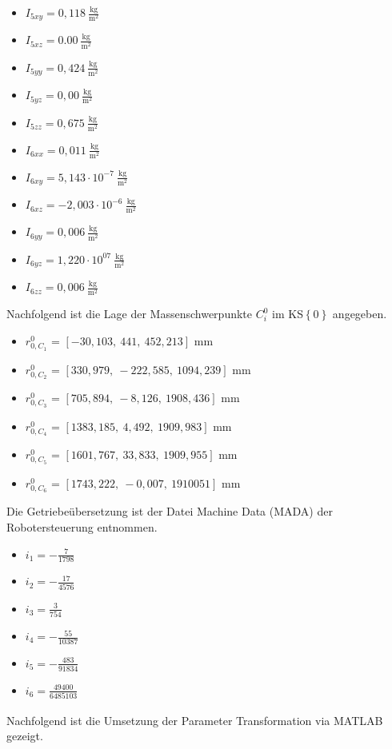 \begin{itemize}
	\item $I_{5xy} = 0,118~\frac{\text{kg}}{\text{m}^2}$
	\item $I_{5xz} = 0.00~\frac{\text{kg}}{\text{m}^2}$
	\item $I_{5yy} = 0,424~\frac{\text{kg}}{\text{m}^2}$
	\item $I_{5yz} = 0,00~\frac{\text{kg}}{\text{m}^2}$
	\item $I_{5zz} = 0,675~\frac{\text{kg}}{\text{m}^2}$
	\\
	\item $I_{6xx} = 0,011~\frac{\text{kg}}{\text{m}^2}$
	\item $I_{6xy} = 5,143\cdot10^{-7}~\frac{\text{kg}}{\text{m}^2}$
	\item $I_{6xz} = -2,003\cdot10^{-6}~\frac{\text{kg}}{\text{m}^2}$
	\item $I_{6yy} = 0,006~\frac{\text{kg}}{\text{m}^2}$
	\item $I_{6yz} = 1,220\cdot10^{07}~\frac{\text{kg}}{\text{m}^2}$
	\item $I_{6zz} = 0,006~\frac{\text{kg}}{\text{m}^2}$
\end{itemize}
%
Nachfolgend ist die Lage der Massenschwerpunkte $C_i^0$ im KS$\left\{0\right\}$ angegeben. 
% 
\begin{itemize}
	\item $r_{0,C_1}^0$ = $\left[-30,103,~441,~452,213\right]$ mm
	\item $r_{0,C_2}^0$ = $\left[330,979,~-222,585,~1094,239\right]$ mm
	\item $r_{0,C_3}^0$ = $\left[705,894,~-8,126,~1908,436\right]$ mm
	\item $r_{0,C_4}^0$ = $\left[1383,185,~4,492,~1909,983\right]$ mm
	\item $r_{0,C_5}^0$ = $\left[1601,767,~33,833,~1909,955\right]$ mm
	\item $r_{0,C_6}^0$ = $\left[1743,222,~-0,007,~1910 051\right]$ mm
\end{itemize}
%
Die Getriebeübersetzung ist der Datei Machine Data (MADA) der Robotersteuerung entnommen.
%
\begin{itemize}
	\item $i_1 = -\frac{7}{1798}$
	\item $i_2 = -\frac{17}{4576}$
	\item $i_3 = \frac{3}{754}$
	\item $i_4 = -\frac{55}{10387}$
	\item $i_5 = -\frac{483}{91834}$
	\item $i_6 = \frac{49400}{6485103}$
\end{itemize}
Nachfolgend ist die Umsetzung der Parameter Transformation via MATLAB\textsuperscript{\textregistered} gezeigt. 
%
%
